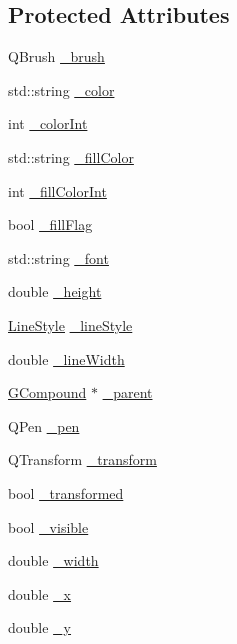 \subsection*{Protected Attributes}
\begin{DoxyCompactItemize}
\item 
Q\+Brush \mbox{\hyperlink{classGObject_aab24462ec896b596d99911767b0912d0}{\+\_\+brush}}
\item 
std\+::string \mbox{\hyperlink{classGObject_a1134e770ae4315ea8bc1201e2f21da8b}{\+\_\+color}}
\item 
int \mbox{\hyperlink{classGObject_a003fdd343d9b7505c53a8b7a134200ed}{\+\_\+color\+Int}}
\item 
std\+::string \mbox{\hyperlink{classGObject_a179f8d6cee65cd8a54692e32b224392a}{\+\_\+fill\+Color}}
\item 
int \mbox{\hyperlink{classGObject_a751def333a67d651e5b99cc331ecb496}{\+\_\+fill\+Color\+Int}}
\item 
bool \mbox{\hyperlink{classGObject_ad4a55cbcd61b58a4d49666490bb2f103}{\+\_\+fill\+Flag}}
\item 
std\+::string \mbox{\hyperlink{classGObject_aea76ea1a8b5dd7b0a78653277e63b536}{\+\_\+font}}
\item 
double \mbox{\hyperlink{classGObject_ad05df29e7f27fc504abd743e3d8b4e73}{\+\_\+height}}
\item 
\mbox{\hyperlink{classGObject_a86e0f5648542856159bb40775c854aa7}{Line\+Style}} \mbox{\hyperlink{classGObject_a89bafecaafb7c72d55c7efc10b7d0523}{\+\_\+line\+Style}}
\item 
double \mbox{\hyperlink{classGObject_a16e9033665937f13de2e163dc2184aff}{\+\_\+line\+Width}}
\item 
\mbox{\hyperlink{classGCompound}{G\+Compound}} $\ast$ \mbox{\hyperlink{classGObject_ac9452c1eaff70eebddbb318196aa3835}{\+\_\+parent}}
\item 
Q\+Pen \mbox{\hyperlink{classGObject_afb69d172743f868299847174eb1b6bc8}{\+\_\+pen}}
\item 
Q\+Transform \mbox{\hyperlink{classGObject_a475b8860a5f1adb4a1fdc58d1f5c1e32}{\+\_\+transform}}
\item 
bool \mbox{\hyperlink{classGObject_ae4725802fc8d8aaa0ab4bd4781f7e07c}{\+\_\+transformed}}
\item 
bool \mbox{\hyperlink{classGObject_a9312c72508471b7c7a87b540263e1af4}{\+\_\+visible}}
\item 
double \mbox{\hyperlink{classGObject_ab55d85a3371770e6725b1062cf160cd8}{\+\_\+width}}
\item 
double \mbox{\hyperlink{classGObject_a6675b83b27137b8d3aa2ad8133078ea6}{\+\_\+x}}
\item 
double \mbox{\hyperlink{classGObject_a2f0f6aeafddc8a39c578bfa7e22b5f1e}{\+\_\+y}}
\end{DoxyCompactItemize}


